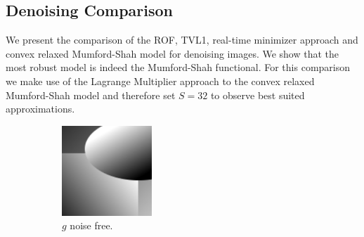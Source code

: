 \documentclass[abstracton]{scrreprt}
\begin{document}

        \subsection{Denoising Comparison} %
        \label{sub:denoising_comparison}
            We present the comparison of the ROF, TVL1, real-time minimizer approach and convex relaxed Mumford-Shah model for denoising images. We show that the most robust model is indeed the Mumford-Shah functional. For this comparison we make use of the Lagrange Multiplier approach to the convex relaxed Mumford-Shah model and therefore set $S = 32$ to observe best suited approximations.
            \begin{figure}[!ht]
                \centering
                \begin{subfigure}[b]{0.24\textwidth}
                    \includegraphics[width=\textwidth]{img/images/synth.png}
                    \caption{$g$ noise free.}
                \end{subfigure}
                \begin{subfigure}[b]{0.24\textwidth}

\end{subfigure}
\end{figure}
\end{document}
